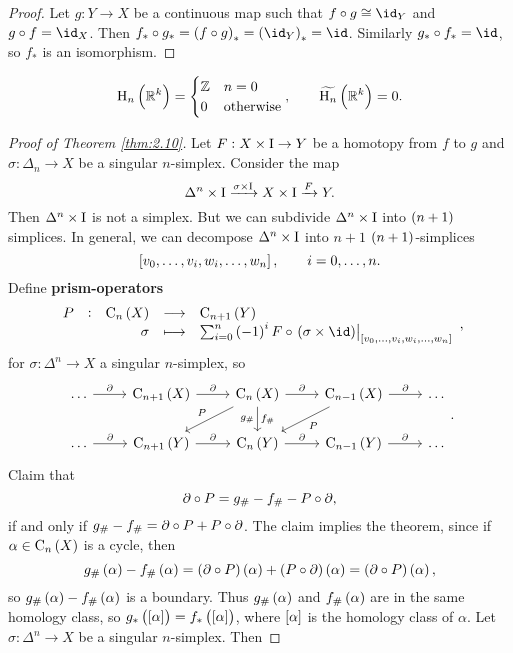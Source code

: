 \begin{proof}
Let $ g : Y \to X $ be a continuous map such that $ f \circ g \cong \id_Y $ and $ g \circ f = \id_X $. Then $ f_* \circ g_* = \br{f \circ g}_* = \br{\id_Y}_* = \id $. Similarly $ g_* \circ f_* = \id $, so $ f_* $ is an isomorphism.
\end{proof}

\begin{example*}
$$ \H_n\br{\RR^k} =
\begin{cases}
\ZZ & n = 0 \\
0 & \text{otherwise}
\end{cases},
\qquad \widetilde{\H_n}\br{\RR^k} = 0.
$$
\end{example*}

\pagebreak

\begin{proof}[Proof of Theorem \ref{thm:2.10}]
Let $ F : X \times \mathrm{I} \to Y $ be a homotopy from $ f $ to $ g $ and $ \sigma : \Delta_n \to X $ be a singular $ n $-simplex. Consider the map
$$ \Delta^n \times \mathrm{I} \xrightarrow{\sigma \times \mathrm{I}} X \times \mathrm{I} \xrightarrow{F} Y. $$
Then $ \Delta^n \times \mathrm{I} $ is not a simplex. But we can subdivide $ \Delta^n \times \mathrm{I} $ into $ \br{n + 1} $ simplices. In general, we can decompose $ \Delta^n \times \mathrm{I} $ into $ n + 1 $ $ \br{n + 1} $-simplices
$$ \sbr{v_0, \dots, v_i, w_i, \dots, w_n}, \qquad i = 0, \dots, n. $$
Define \textbf{prism-operators}
$$ \function[P]{\C_n\br{X}}{\C_{n + 1}\br{Y}}{\sigma}{\sum_{i = 0}^n \br{-1}^iF \circ \eval{\br{\sigma \times \id}}_{\sbr{v_0, \dots, v_i, w_i, \dots, w_n}}}, $$
for $ \sigma : \Delta^n \to X $ a singular $ n $-simplex, so
$$
\begin{tikzcd}
\dots \arrow{r}{\da} & \C_{n + 1}\br{X} \arrow{r}{\da} & \C_n\br{X} \arrow{r}{\da} \arrow{dl}[swap]{P} \arrow{d}{f_\#}[swap]{g_\#} & \C_{n - 1}\br{X} \arrow{r}{\da} \arrow{dl}{P} & \dots \\
\dots \arrow{r}{\da} & \C_{n + 1}\br{Y} \arrow{r}{\da} & \C_n\br{Y} \arrow{r}{\da} & \C_{n - 1}\br{Y} \arrow{r}{\da} & \dots
\end{tikzcd}.
$$
Claim that
$$ \partial \circ P = g_\# - f_\# - P \circ \partial, $$
if and only if $ g_\# - f_\# = \partial \circ P + P \circ \partial $. The claim implies the theorem, since if $ \alpha \in \C_n\br{X} $ is a cycle, then
$$ g_\#\br{\alpha} - f_\#\br{\alpha} = \br{\da \circ P}\br{\alpha} + \br{P \circ \da}\br{\alpha} = \br{\da \circ P}\br{\alpha}, $$
so $ g_\#\br{\alpha} - f_\#\br{\alpha} $ is a boundary. Thus $ g_\#\br{\alpha} $ and $ f_\#\br{\alpha} $ are in the same homology class, so $ g_*\br{\sbr{\alpha}} = f_*\br{\sbr{\alpha}} $, where $ \sbr{\alpha} $ is the homology class of $ \alpha $. Let $ \sigma : \Delta^n \to X $ be a singular $ n $-simplex. Then

\end{proof}
